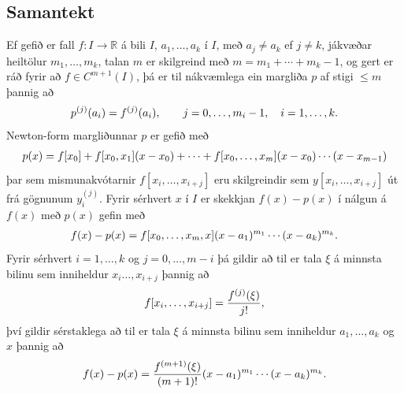 \documentclass[letterpaper,10pt,icelandic]{sphinxmanual}
\begin{document}
\subsection{Samantekt}
\label{kafli03:id9}
Ef gefið er fall \(f:I\to {{\mathbb  R}}\) á bili \(I\),
\(a_1,\dots,a_k\) í \(I\), með \(a_j\neq a_k\) ef
\(j\neq k\), jákvæðar heiltölur \(m_1,\dots,m_k\), talan
\(m\) er skilgreind með \(m=m_1+\cdots+m_k-1\), og gert er ráð
fyrir að \(f\in C^{m+1}(I)\), þá er til nákvæmlega ein margliða
\(p\) af stigi \(\leq m\) þannig að
\begin{gather}
\begin{split}p^{(j)}(a_i)=f^{(j)}(a_i), \qquad j=0,\dots, m_i-1, \quad i=1,\dots,k.\end{split}\notag
\end{gather}
Newton-form margliðunnar \(p\) er gefið með
\begin{gather}
\begin{split}p(x)=f[x_0]+f[x_0,x_1](x-x_0)+\cdots+f[x_0,\dots,x_m](x-x_0)\cdots(x-x_{m-1})\end{split}\notag
\end{gather}
þar sem mismunakvótarnir \(f[x_i,\dots,x_{i+j}]\) eru skilgreindir
sem \(y[x_i,\dots,x_{i+j}]\) út frá gögnunum \(y^{(j)}_i\).
Fyrir sérhvert \(x\) í \(I\) er skekkjan \(f(x)-p(x)\) í
nálgun á \(f(x)\) með \(p(x)\) gefin með
\begin{gather}
\begin{split}f(x)-p(x)=f[x_0,\dots,x_m,x](x-a_1)^{m_1}\cdots(x-a_k)^{m_k}.\end{split}\notag
\end{gather}
Fyrir sérhvert \(i=1,\dots,k\) og \(j=0,\dots,m-i\) þá gildir að
til er tala \(\xi\) á minnsta bilinu sem inniheldur
\(x_i\dots,x_{i+j}\) þannig að
\begin{gather}
\begin{split}f[x_i,\dots,x_{i+j}]=\dfrac{f^{(j)}(\xi)}{j!},\end{split}\notag
\end{gather}
því gildir sérstaklega að til er tala \(\xi\) á minnsta bilinu sem
inniheldur \(a_1,\dots,a_k\) og \(x\) þannig að
\begin{gather}
\begin{split}f(x)-p(x)=\dfrac{f^{(m+1)}(\xi)}{(m+1)!}(x-a_1)^{m_1}\cdots(x-a_k)^{m_k}.\end{split}\notag
\end{gather}
\end{document}
